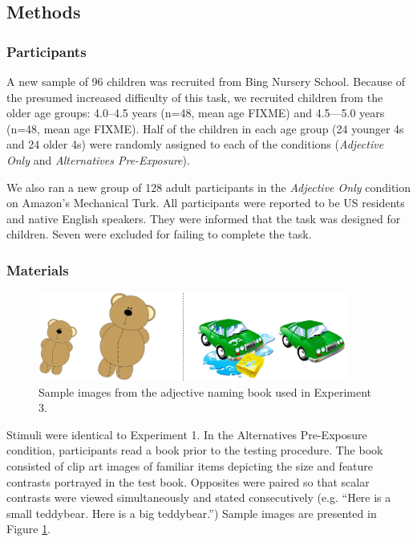 \documentclass[man]{apa2}
\begin{document}
\subsection{Methods}

\subsubsection{Participants}

A new sample of 96 children was recruited from Bing Nursery School.  Because of the presumed increased difficulty of this task, we recruited children from the older age groups: 4.0--4.5 years (n=48, mean age FIXME) and 4.5---5.0 years (n=48, mean age FIXME).  Half of the children in each age group (24 younger 4s and 24 older 4s) were randomly assigned to each of the conditions (\emph{Adjective Only} and \emph{Alternatives Pre-Exposure}). 

We also ran a new group of 128 adult participants in the \emph{Adjective Only} condition on Amazon's Mechanical Turk.  All participants were reported to be US residents and native English speakers.  They were informed that the task was designed for children.  Seven were excluded for failing to complete the task. 

\subsubsection{Materials}

\begin{figure}[t] 
  \begin{center} 
    \includegraphics[width=4in]{figures/aliens_book_demo_mod.png} 
    \caption{\label{fig:book_demo} Sample images from the adjective naming book used in Experiment 3.}
  \end{center} 
\end{figure}

Stimuli were identical to Experiment 1. In the Alternatives Pre-Exposure condition, participants read a book prior to the testing procedure.  The book consisted of clip art images of familiar items depicting the size and feature contrasts portrayed in the test book. Opposites were paired so that scalar contrasts were viewed simultaneously and stated consecutively (e.g. ``Here is a small teddybear.  Here is a big teddybear.'')  Sample images are presented in Figure \ref{fig:book_demo}.
\end{document}
